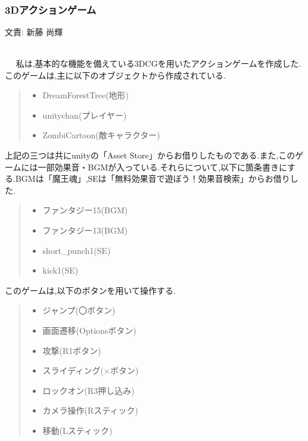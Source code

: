 \documentclass[a4paper]{jarticle}
\newcommand{\resp}[1]{\begin{flushright}文責: #1\end{flushright}~\\　}
\begin{document}
  　\subsubsection{3Dアクションゲーム}
        \resp{新藤 尚輝}
        私は,基本的な機能を備えている3DCGを用いたアクションゲームを作成した.\\
        このゲームは,主に以下のオブジェクトから作成されている.
        \begin{quote}
          \begin{itemize}
            \item DreamForestTree(地形)
            \item unitychan(プレイヤー)
            \item ZombiCartoon(敵キャラクター)
          \end{itemize}
        \end{quote}
        上記の三つは共にunityの「Asset Store」からお借りしたものである.また,このゲームには一部効果音・BGMが入っている.それらについて,以下に箇条書きにする.BGMは「魔王魂」,SEは「無料効果音で遊ぼう！効果音検索」からお借りした.\\
        \begin{quote}
          \begin{itemize}
            \item ファンタジー15(BGM)
            \item ファンタジー13(BGM)
            \item short\_punch1(SE)
            \item kick1(SE)
          \end{itemize}
        \end{quote}
        
        このゲームは,以下のボタンを用いて操作する.\\
        \begin{quote}
          \begin{itemize}
            \item ジャンプ(〇ボタン)
            \item 画面遷移(Optionsボタン)
            \item 攻撃(R1ボタン)
            \item スライディング(×ボタン)
            \item ロックオン(R3押し込み)
            \item カメラ操作(Rスティック)
            \item 移動(Lスティック)
          \end{itemize}
        \end{quote}
        
\end{document}
